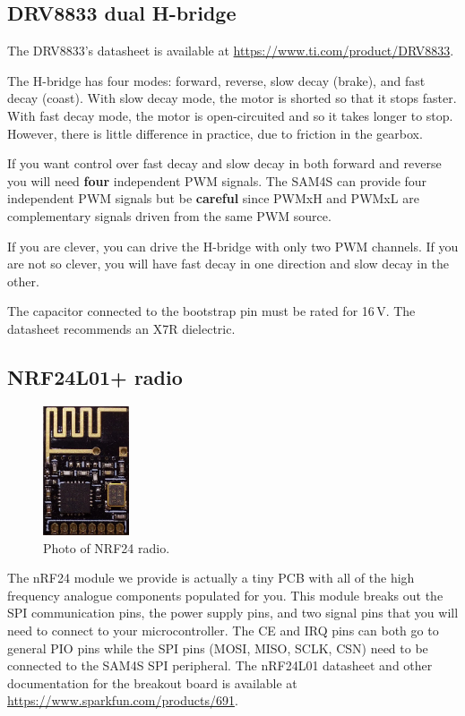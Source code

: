 \subsection{DRV8833 dual H-bridge}\label{drv8833-dual-h-bridge}

The DRV8833's datasheet is available at
\url{https://www.ti.com/product/DRV8833}.

The H-bridge has four modes: forward, reverse, slow decay (brake), and
fast decay (coast).  With slow decay mode, the motor is shorted so
that it stops faster.  With fast decay mode, the motor is
open-circuited and so it takes longer to stop.  However, there is
little difference in practice, due to friction in the gearbox.

If you want control over fast decay and slow decay in both forward and
reverse you will need \textbf{four} independent PWM signals. The SAM4S
can provide four independent PWM signals but be \textbf{careful} since
PWMxH and PWMxL are complementary signals driven from the same PWM
source.

If you are clever, you can drive the H-bridge with only two PWM
channels.  If you are not so clever, you will have fast decay in one
direction and slow decay in the other.

The capacitor connected to the bootstrap pin must be rated for
16\,V. The datasheet recommends an X7R dielectric.

\subsection{NRF24L01+ radio}

\begin{figure}[!h]
  \centering \includegraphics[width=1in]{figs/nrf24.jpg}
  \caption{Photo of NRF24 radio.}
  \label{fig:nrf24}
\end{figure}

The nRF24 module we provide is actually a tiny PCB with all of the high
frequency analogue components populated for you. This module breaks out
the SPI communication pins, the power supply pins, and two signal pins
that you will need to connect to your microcontroller. The CE and IRQ
pins can both go to general PIO pins while the SPI pins (MOSI, MISO,
SCLK, CSN) need to be connected to the SAM4S SPI peripheral. The
nRF24L01 datasheet and other documentation for the breakout board is
available at \url{https://www.sparkfun.com/products/691}.

